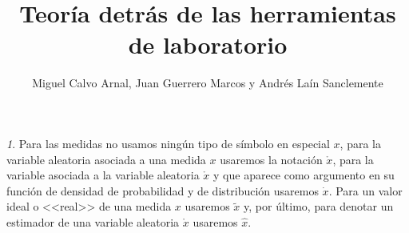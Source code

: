 \documentclass[11pt,a4paper,spanish]{article}
\title{Teoría detrás de las herramientas de laboratorio}
\author{Miguel Calvo Arnal, Juan Guerrero Marcos y Andrés Laín Sanclemente}
\date{}
\numberwithin{equation}{section}
\numberwithin{table}{section}
\numberwithin{figure}{section}
\theoremstyle{definition}
\theoremstyle{remark}
\newtheorem{notation}{\protect\notationname}[section]
\theoremstyle{definition}
\theoremstyle{remark}
\theoremstyle{plain}
\theoremstyle{plain}
\theoremstyle{plain}
\theoremstyle{plain}
\theoremstyle{plain}
\theoremstyle{plain}
\providecommand{\notationname}{Notación}
\begin{document}
	\maketitle
	\newpage
	\tableofcontents
	\newpage
	
	\begin{notation}
		Para las medidas no usamos ningún tipo de símbolo en especial $x$,
		para la variable aleatoria asociada a una medida $x$ usaremos la
		notación $\mathring{x}$, para la variable asociada a la variable
		aleatoria $\mathring{x}$ y que aparece como argumento en su función
		de densidad de probabilidad y de distribución usaremos $\dot{x}$.
		Para un valor ideal o <<real>> de una medida $x$ usaremos $\tilde{x}$
		y, por último, para denotar un estimador de una variable aleatoria
		$\mathring{x}$ usaremos $\hat{x}$.
	\end{notation}
\end{document}
